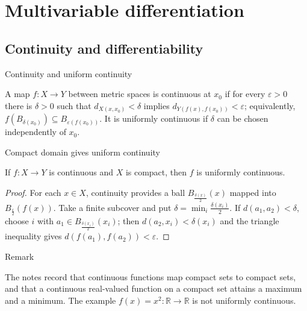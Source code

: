 \chapter{Multivariable differentiation}

\section{Continuity and differentiability}

\begin{definition}{Continuity and uniform continuity}

A map \(f:X\rightarrow Y\) between metric spaces is continuous at \(x_{0}\) if for every \(\varepsilon > 0\) there is \(\delta > 0\) such that \(d_{X{({x,x_{0}})}} < \delta\) implies \(d_{Y{({f{(x)},f{(x_{0})}})}} < \varepsilon\); equivalently, \(f\left( B_{\delta{(x_{0})}} \right) \subseteq B_{\varepsilon{({f{(x_{0})}})}}\). It is uniformly continuous if \(\delta\) can be chosen independently of \(x_{0}\).

\end{definition}

\begin{theorem}{Compact domain gives uniform continuity}

If \(f:X\rightarrow Y\) is continuous and \(X\) is compact, then \(f\) is uniformly continuous.

\end{theorem}

\begin{proof}

For each \(x \in X\), continuity provides a ball \(B_{\frac{\delta{(x)}}{2}}(x)\) mapped into \(B_{\frac{\varepsilon}{2}}\left( {f(x)} \right)\). Take a finite subcover and put \(\delta = \min_{i}\frac{\delta\left( x_{i} \right)}{2}\). If \(d\left( {a_{1},a_{2}} \right) < \delta\), choose \(i\) with \(a_{1} \in B_{\frac{\delta{(x_{i})}}{2}}\left( x_{i} \right)\); then \(d\left( {a_{2},x_{i}} \right) < \delta\left( x_{i} \right)\) and the triangle inequality gives \(d\left( {f\left( a_{1} \right),f\left( a_{2} \right)} \right) < \varepsilon\).

\end{proof}

\begin{qlremark}{Remark}

The notes record that continuous functions map compact sets to compact sets, and that a continuous real-valued function on a compact set attains a maximum and a minimum. The example \(f(x) = x^{2}:\mathbb{R}\rightarrow\mathbb{R}\) is not uniformly continuous.

\end{qlremark}

